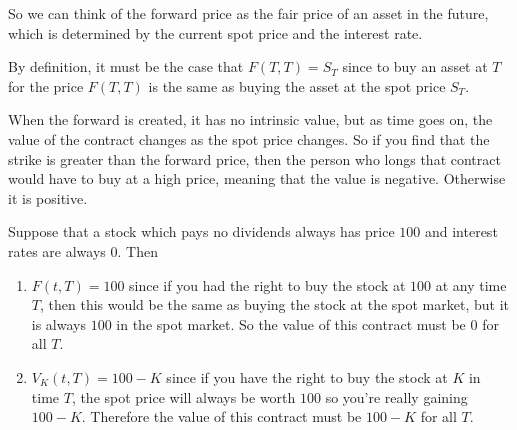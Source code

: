 \documentclass{article}
\begin{document}
    So we can think of the forward price as the fair price of an asset in the future, which is determined by the current spot price and the interest rate. 

    \begin{lemma}
      By definition, it must be the case that $F(T, T) = S_T$ since to buy an asset at $T$ for the price $F(T, T)$ is the same as buying the asset at the spot price $S_T$. 
    \end{lemma}

    When the forward is created, it has no intrinsic value, but as time goes on, the value of the contract changes as the spot price changes. So if you find that the strike is greater than the forward price, then the person who longs that contract would have to buy at a high price, meaning that the value is negative. Otherwise it is positive. 

    \begin{example}
      Suppose that a stock which pays no dividends always has price $100$ and interest rates are always $0$. Then 
      \begin{enumerate}
        \item $F(t, T) = 100$ since if you had the right to buy the stock at $100$ at any time $T$, then this would be the same as buying the stock at the spot market, but it is always $100$ in the spot market. So the value of this contract must be $0$ for all $T$. 
        \item $V_K (t, T) = 100 - K$ since if you have the right to buy the stock at $K$ in time $T$, the spot price will always be worth $100$ so you're really gaining $100 - K$. Therefore the value of this contract must be $100 - K$ for all $T$. 
      \end{enumerate}
    \end{example}
\end{document}
